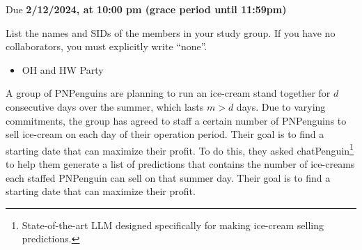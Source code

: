 \documentclass[11pt]{article}
\def\duedate{2/12/2024, at 10:00 pm (grace period until 11:59pm)}
\begin{document}
\maketitle


Due \textbf{\duedate}

List the names and SIDs of the members in your study group.
If you have no collaborators, you must explicitly write ``none''.

\begin{solution}
\begin{itemize}
    \item OH and HW Party
\end{itemize}
\end{solution}


A group of PNPenguins are planning to run an ice-cream stand together for $d$ consecutive days over the summer, which lasts $m > d$ days. Due to varying commitments, the group has agreed to staff a certain number of PNPenguins to sell ice-cream on each day of their operation period. Their goal is to find a starting date that can maximize their profit. To do this, they asked chatPenguin\footnote{State-of-the-art LLM designed specifically for making ice-cream selling predictions.} to help them generate a list of predictions that contains the number of ice-creams each staffed PNPenguin can sell on that summer day. Their goal is to find a starting date that can maximize their profit. 
\end{document}
